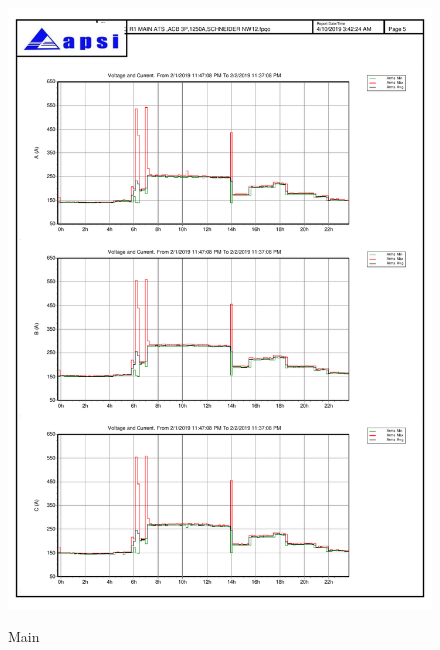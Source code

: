 \begin{figure}
	\includegraphics[width=\textwidth]{figures/fig_ch04_elecaudit_load_flow_main.pdf} \\
	\caption{Main}
	\label{fig_ch04_elecaudit_load_flow_main} 
\end{figure}

